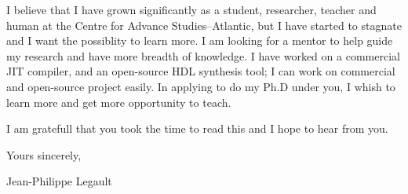 \documentclass[english,letterpaper,12pt]{deedy-resume-openfont}
\begin{document}
I believe that I have grown significantly as a student, researcher, teacher and human at the Centre for Advance Studies--Atlantic, but I have started to stagnate and I want the possiblity to learn more.
I am looking for a mentor to help guide my research and have more breadth of knowledge.
I have worked on a commercial JIT compiler, and an open-source HDL synthesis tool; I can work on commercial and open-source project easily.
In applying to do my Ph.D under you, I whish to learn more and get more opportunity to teach.

I am gratefull that you took the time to read this and I hope to hear from you.

\vspace*{20pt}

\noindent Yours sincerely,

\indent Jean-Philippe Legault
\end{document}
